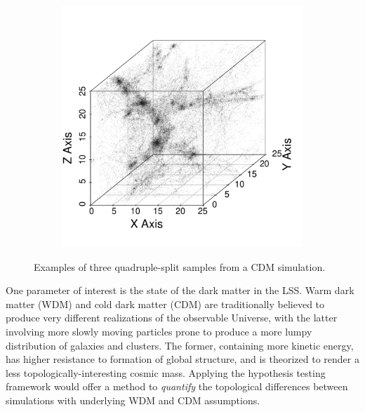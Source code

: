 \documentclass[12pt]{article}
\begin{document}
\begin{figure}[htp!]
\begin{subfigure}{0.25\textwidth}
    \label{fig:cubeDiagsB}
  \end{subfigure}
    \begin{subfigure}{0.25\textwidth}
    \centering
        \caption{}
  \includegraphics[width=\linewidth]{figure_10_cdm_slice_51.pdf}
    \label{fig:cubeDiagsC}
  \end{subfigure}
    \caption{Examples of three quadruple-split samples from a CDM simulation.}
    \label{fig:cubeDiags}
\end{figure}

One parameter of interest is the state of the dark matter in the LSS. Warm dark matter (WDM) and cold dark matter (CDM) are traditionally believed to produce very different realizations of the observable Universe, with the latter involving more slowly moving particles prone to produce a more lumpy distribution of galaxies and clusters. The former, containing more kinetic energy, has higher resistance to formation of global structure, and is theorized to render a less topologically-interesting cosmic mass. Applying the hypothesis testing framework would offer a method to \emph{quantify} the topological differences between simulations with underlying WDM and CDM assumptions.
\end{document}
